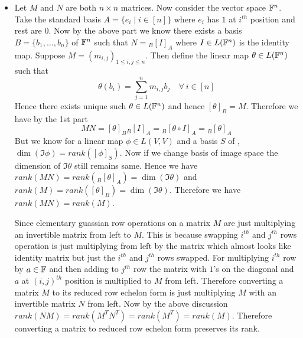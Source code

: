 \documentclass[a4paper, 11pt]{article}
\begin{document}
{\begin{itemize}[label=$\bullet$]
\begin{itemize}
\end{itemize}
Hence invertible matrices correspond to basis changes
\item Let $M$ and $N$ are both $n\times n$ matrices. Now consider the vector space $\mathbb{F}^n$. Take the standard basis $A=\{e_i\mid i\in[n]\}$ where $e_i$ has $1$ at $i^{th}$ position and rest are $0$. Now by the above part we know there exists a basis $B=\{b_1,\dots,b_n\}$ of $\mathbb{F}^n$ such that $N={}_B[I]_A$ where $I\in L(\mathbb{F}^n)$ is the identity map. Suppose $M=(m_{i,j})_{1\leq i,j\leq n}$. Then define the linear map $\theta\in L(\mathbb{F}^n)$ such that $$\theta(b_i)=\sum_{j=1}^n m_{i,j}b_j\quad \forall\ i\in[n]$$Hence there exists unique such $\theta\in L(\mathbb{F}^n)$ and hence $[\theta]_B=M$. Therefore we have by the 1st part $$MN=[\theta]_B{}_B[I]_A={}_B[\theta\circ I]_A={}_B[\theta]_A$$But we know for a linear map $\phi\in L(V,V)$ and a basis $S$ of , $\dim(\Im\phi)=rank([\phi]_S) $. Now if we change basis of image space the dimension of $\Im\theta$ still remains same. Hence we have $rank(MN)=rank({}_B[\theta]_A)=\dim (\Im\theta)$ and $rank(M)=rank([\theta]_B)=\dim (\Im \theta)$. Therefore we have $rank(MN)=rank(M)$. \parinn

Since elementary guassian row operations on a matrix $M$ are just multiplying an invertible matrix from left to $M$. This is because swapping $i^{th}$ and $j^{th}$ rows operation is just multiplying from left by the matrix which  almost  looks like identity matrix but just the $i^{th}$ and $j^{th}$ rows swapped. For multiplying  $i^{th}$ row by $a\in\mathbb{F}$ and then adding to $j^{th}$ row the matrix with $1$'s on the diagonal and $a$ at $(i,j)^{th}$ position is multiplied to $M$ from left.  Therefore converting a matrix $M$ to its reduced row echelon form is just multiplying $M$ with an invertible matrix $N$ from left. Now by the above discussion $rank(NM)=rank(M^TN^T)=rank(M^T)=rank(M)$. Therefore converting a matrix to reduced row echelon form preserves its rank. 
\end{itemize}
}
\end{document}
